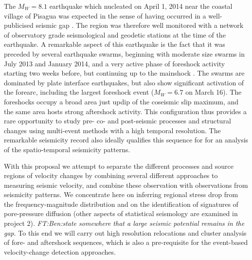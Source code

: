 \documentclass[11pt]{article}
\newcommand{\note}[1]{{\it \color{red} #1}}
\newcommand{\noteft}[1]{{\it \color{magenta} FT:#1}}
\newcommand{\note}[1]{}
\newcommand{\noteft}[1]{}
\begin{document}
The $M_W=8.1$ earthquake which nucleated on April 1, 2014 near the coastal village of Pisagua was expected in the sense of having occurred in a well-publicised seismic gap \citep{comte91}. The region was therefore well monitored with a network of observatory grade seismological and geodetic stations at the time of the earthquake.%
A remarkable aspect of this earthquake is the fact that it was preceded by several earthquake swarms, beginning with moderate size swarms in July 2013 and January 2014, and a very active phase of foreshock activity starting two weeks before, but continuing up to the mainshock \citep{ruiz14,schurr2014,hayes2014}. The swarms are dominated by plate interface earthquakes, but also show significant activation of the forearc, including the largest foreshock event ($M_W=6.7$ on March 16). The foreshocks occupy a broad area just updip of the coseismic slip maximum, and the same area hosts strong aftershock activity. This configuration thus provides a rare opportunity to study pre- co- and post-seismic processes and structural changes using multi-event methods with a high temporal resolution.
The remarkable seismicity record also ideally qualifies this sequence for for an analysis of the spatio-temporal seismicity patterns. %

With this proposal we attempt to separate the different processes and source regions of velocity changes by combining several different approaches to measuring seismic velocity, and combine these observation with observations from seismicity patterns.  We concentrate here on inferring regional stress drop from the frequency-magnitude distribution and on the identification of signatures of pore-pressure diffusion \citep{shapiro:2011} (other aspects of statistical seismology are examined in project 2).\noteft{Ben:state somewhere that a large seismic potential remains in the gap}. To this end we will carry out high resolution relocations and cluster analysis of fore- and aftershock sequences, which is also a pre-requisite for the event-based velocity-change detection approaches.
\end{document}
